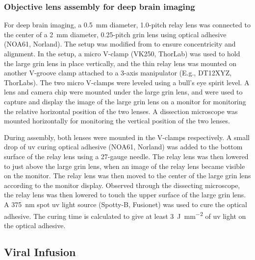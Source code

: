 \subsubsection{Objective lens assembly for deep brain imaging} \label{objective-assembly}

For deep brain imaging, a \SI{0.5}{\mm} diameter, 1.0-pitch relay lens was connected to the center of a \SI{2}{\mm} diameter, 0.25-pitch \gls{grin} lens using optical adhesive (NOA61, Norland). The setup was modified from \citep{kim12} to ensure concentricity and alignment. In the setup, a micro V-clamp (VK250, ThorLab) was used to hold the large \gls{grin} lens in place vertically, and the thin relay lens was mounted on another V-groove clamp attached to a 3-axis manipulator (E.g., DT12XYZ, ThorLabs). The two micro V-clamps were leveled using a bull's eye spirit level. A lens and camera chip were mounted under the large \gls{grin} lens, and were used to capture and display the image of the large \gls{grin} lens on a monitor for monitoring the relative horizontal position of the two lenses. A dissection microscope was mounted horizontally for monitoring the vertical position of the two lenses. 

During assembly, both lenses were mounted in the V-clamps respectively. A small drop of \gls{uv} curing optical adhesive (NOA61, Norland) was added to the bottom surface of the relay lens using a 27-gauge needle. The relay lens was then lowered to just above the large \gls{grin} lens, when an image of the relay lens became visible on the monitor. The relay lens was then moved to the center of the large \gls{grin} lens according to the monitor display. Observed through the dissecting microscope, the relay lens was then lowered to touch the upper surface of the large \gls{grin} lens. A \SI{375}{\nm} spot \gls{uv} light source (Spotty-B, Fusionet) was used to cure the optical adhesive. The curing time is calculated to give at least \SI{3}{\J\per\mm\squared} of \gls{uv} light on the optical adhesive. 

\subsection{Viral Infusion \label{viral-infusion}}

